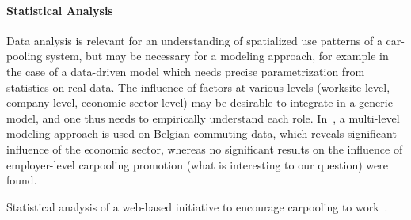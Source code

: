 \paragraph{Statistical Analysis}

Data analysis is relevant for an understanding of spatialized use patterns of a car-pooling system, but may be necessary for a modeling approach, for example in the case of a data-driven model which needs precise parametrization from statistics on real data. The influence of factors at various levels (worksite level, company level, economic sector level) may be desirable to integrate in a generic model, and one thus needs to empirically understand each role. In~\cite{vanoutrive2009carpooling}, a multi-level modeling approach is used on Belgian commuting data, which reveals significant influence of the economic sector, whereas no significant results on the influence of employer-level carpooling promotion (what is interesting to our question) were found.


Statistical analysis of a web-based initiative to encourage carpooling to work~\cite{Abrahamse201245}.


















